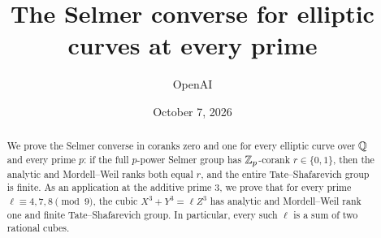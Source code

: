 \documentclass[11pt]{article}
\title{The Selmer converse for elliptic curves at every prime}
\author{OpenAI}
\date{October 7, 2026}
\begin{document}
\maketitle
\begin{abstract}
We prove the Selmer converse in coranks zero and one for every elliptic
curve over $\mathbb Q$ and every prime $p$: if the full $p$-power Selmer group
has $\mathbb Z_p$-corank $r\in\{0,1\}$, then the analytic and Mordell--Weil ranks
both equal $r$, and the entire Tate--Shafarevich group is finite.
As an application at the additive prime $3$, we prove that for every prime
$\ell\equiv4,7,8\pmod9$, the cubic $X^3+Y^3=\ell Z^3$ has analytic and
Mordell--Weil rank one and finite Tate--Shafarevich group.
In particular, every such $\ell$ is a sum of two rational cubes.
\end{abstract}
\tableofcontents










\appendix



\end{document}
